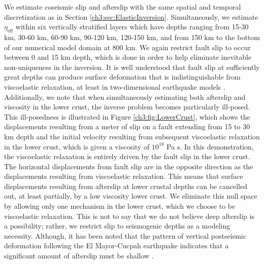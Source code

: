 We estimate coseismic slip and afterslip with the same spatial and temporal discretization as in Section \ref{ch3:sec:ElasticInversion}. Simultaneously, we estimate $\eta_{\mathrm{eff}}$ within six vertically stratified layers which have depths ranging from 15-30 km, 30-60 km, 60-90 km, 90-120 km, 120-150 km, and from 150 km to the bottom of our numerical model domain at 800 km.  We again restrict fault slip to occur between 0 and 15 km depth, which is done in order to help eliminate inevitable non-uniqueness in the inversion.  It is well understood that fault slip at sufficiently great depths can produce surface deformation that is indistinguishable from viscoelastic relaxation, at least in two-dimensional earthquake models \citep{Savage1990}.  Additionally, we note that when simultaneously estimating both afterslip and viscosity in the lower crust, the inverse problem becomes particularly ill-posed. This ill-posedness is illustrated in Figure \ref{ch3:fig:LowerCrust}, which shows the displacements resulting from a meter of slip on a fault extending from 15 to 30 km depth and the initial velocity resulting from subsequent viscoelastic relaxation in the lower crust, which is given a viscosity of $10^{18}$ Pa s.  In this demonstration, the viscoelastic relaxation is entirely driven by the fault slip in the lower crust.  The horizontal displacements from fault slip are in the opposite direction as the displacements resulting from viscoelastic relaxation.  This means that surface displacements resulting from afterslip at lower crustal depths can be cancelled out, at least partially, by a low viscosity lower crust.  We eliminate this null space by allowing only one mechanism in the lower crust, which we choose to be viscoelastic relaxation.  This is not to say that we do not believe deep afterslip is a possibility; rather, we restrict slip to seismogenic depths as a modeling necessity. Although, it has been noted that the pattern of vertical postseismic deformation following the El Mayor-Cucpah earthquake indicates that a significant amount of afterslip must be shallow \citep{Rollins2015}.  
 
